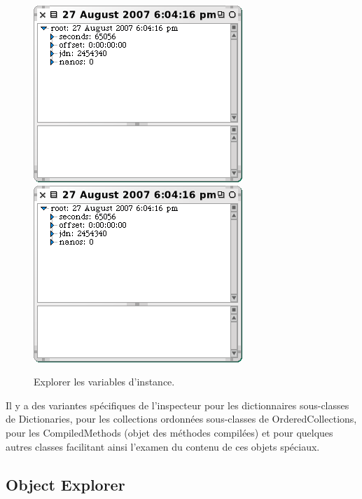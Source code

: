 \documentclass[a4paper,10pt,twoside]{book}
\begin{document}
\begin{figure}[tbp]
\begin{minipage}{0.48\textwidth}
	\begin{center}
	\ifluluelse
		{\includegraphics[width=\textwidth]{exploreTimeStampNow2}}
		{\includegraphics[scale=0.7]{exploreTimeStampNow2}}
	\end{center}
	\caption{Explorer les variables d'instance.}
	\label{fig:exploreTimeStampNow2}
\end{minipage}
\end{figure}

Il y a des variantes sp\'ecifiques de l'inspecteur pour les dictionnaires sous-classes de Dictionaries, pour les collections ordonn\'ees sous-classes de OrderedCollections, pour les CompiledMethods (objet des m\'ethodes compil\'ees)
et pour quelques autres classes facilitant ainsi l'examen du contenu de
ces objets sp\'eciaux.

\subsection{Object Explorer}
\end{document}
